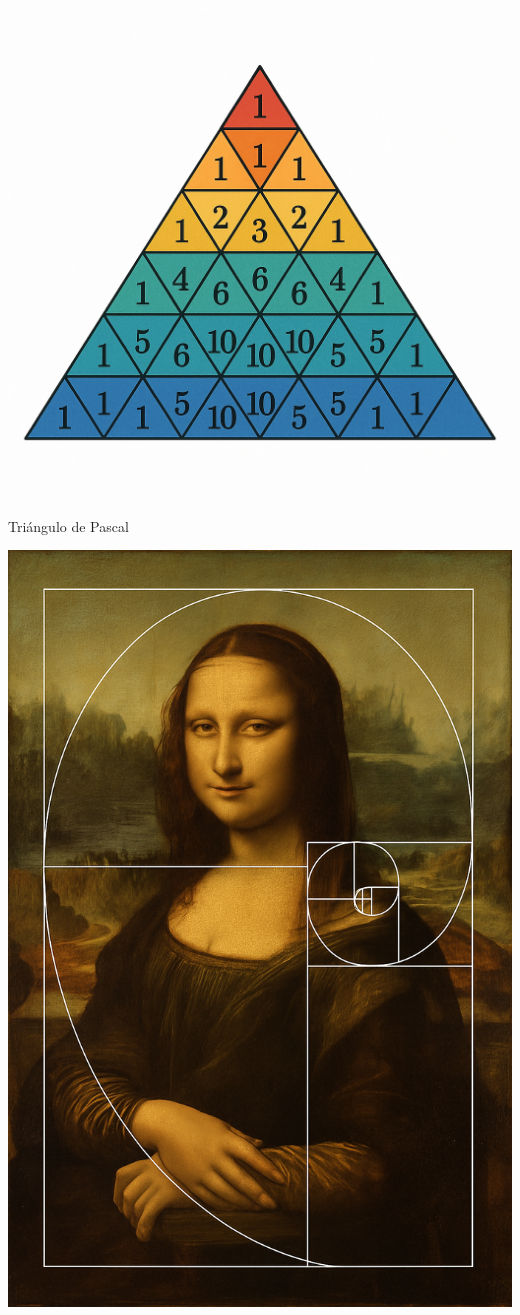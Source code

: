 \documentclass[final]{beamer}
\begin{document}
\begin{frame}[t]
\begin{center}
\begin{minipage}[t]{0.32\textwidth}
    \centering
    \includegraphics[width=0.95\linewidth]{imagen4.png}\\
    \small Triángulo de Pascal
\end{minipage}
\hfill
\begin{minipage}[t]{0.32\textwidth}
    \centering
    \includegraphics[width=0.8\linewidth]{imagen5.png}\\

\end{minipage}
\end{center}
\end{frame}
\end{document}
